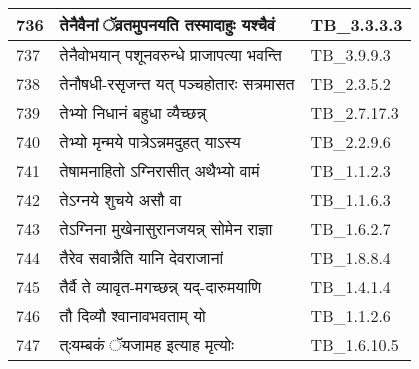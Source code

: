 \documentclass[17pt]{extarticle}
\begin{document}
\begin{longtable}{||p{0.4in}||p{4.9in}||p{0.9in}||}
    \hline
        
    736 & तेनैवैनां ॅव्रतमुपनयति तस्मादाहुः यश्चैवं & TB\_3.3.3.3       \\
    
    \hline
        
    737 & तेनैवोभयान् पशूनवरुन्धे प्राजापत्या भवन्ति & TB\_3.9.9.3       \\
    
    \hline
        
    738 & तेनौषधी{-}रसृजन्त यत् पञ्चहोतारः सत्रमासत & TB\_2.3.5.2       \\
    
    \hline
        
    739 & तेभ्यो निधानं बहुधा व्यैच्छन्न् & TB\_2.7.17.3       \\
    
    \hline
        
    740 & तेभ्यो मृन्मये पात्रेऽन्नमदुहत् याऽस्य & TB\_2.2.9.6       \\
    
    \hline
        
    741 & तेषामनाहितो ऽग्निरासीत् अथैभ्यो वामं & TB\_1.1.2.3       \\
    
    \hline
        
    742 & तेऽग्नये शुचये असौ वा & TB\_1.1.6.3       \\
    
    \hline
        
    743 & तेऽग्निना मुखेनासुरानजयन्न् सोमेन राज्ञा & TB\_1.6.2.7       \\
    
    \hline
        
    744 & तैरेव सवान्नैति यानि देवराजानां & TB\_1.8.8.4       \\
    
    \hline
        
    745 & तैर्वै ते व्यावृत{-}मगच्छन्न् यद्{-}दारुमयाणि & TB\_1.4.1.4       \\
    
    \hline
        
    746 & तौ दिव्यौ श्वानावभवताम् यो & TB\_1.1.2.6       \\
    
    \hline
        
    747 & त्ःयम्बकं ॅयजामह इत्याह मृत्योः & TB\_1.6.10.5       \\
    
    \hline
        

\end{longtable}
\end{document}
